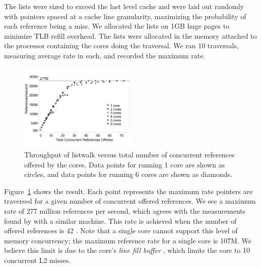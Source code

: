 \documentclass{acm_proc_article-sp}
\begin{document}
The lists were sized to exceed the last level cache and were laid out
randomly with pointers spaced at a cache line granularity, maximizing
the probability of each reference being a miss. We allocated the lists
on 1GB huge pages to minimize TLB refill overhead. The lists were
allocated in the memory attached to the processor containing the cores
doing the traversal. We ran 10 traversals, measuring average rate in each, and recorded the maximum rate.


\begin{figure}[h]
	\begin{center}
		\includegraphics[width=0.5\textwidth]{figures/multi-listwalk-totalconc-edited.pdf}
	\end{center}
	\caption{Throughput of listwalk versus total number of
          concurrent references offered by the cores. Data points for
          running 1 core are shown as circles, and data points for
          running 6 cores are shown as diamonds. 
        }
	\label{fig:listwalk-totalconc}
\end{figure}

Figure~\ref{fig:listwalk-totalconc} shows the result. Each point represents
the maximum rate pointers are traversed for a given number of
concurrent offered references. We see a maximum rate of 277 million
references per second, which agrees with the measurements found by \cite{Mandal:2010} with a similar machine. This rate is achieved when the number of offered
references is 42 . Note that a single core cannot support this level of
memory concurrency; the maximum reference rate for a single core is
107M. We believe this limit is due to the core's {\em line fill
  buffer} , which limits the core to 10
concurrent L2 misses.
\end{document}
